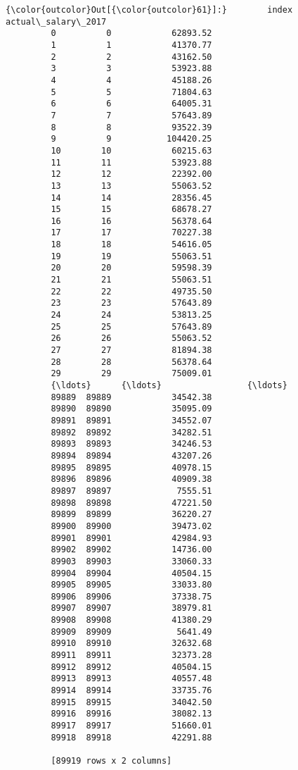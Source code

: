 \documentclass[11pt]{article}
\begin{document}
\begin{Verbatim}[commandchars=\\\{\}]
{\color{outcolor}Out[{\color{outcolor}61}]:}        index  actual\_salary\_2017
         0          0            62893.52
         1          1            41370.77
         2          2            43162.50
         3          3            53923.88
         4          4            45188.26
         5          5            71804.63
         6          6            64005.31
         7          7            57643.89
         8          8            93522.39
         9          9           104420.25
         10        10            60215.63
         11        11            53923.88
         12        12            22392.00
         13        13            55063.52
         14        14            28356.45
         15        15            68678.27
         16        16            56378.64
         17        17            70227.38
         18        18            54616.05
         19        19            55063.51
         20        20            59598.39
         21        21            55063.51
         22        22            49735.50
         23        23            57643.89
         24        24            53813.25
         25        25            57643.89
         26        26            55063.52
         27        27            81894.38
         28        28            56378.64
         29        29            75009.01
         {\ldots}      {\ldots}                 {\ldots}
         89889  89889            34542.38
         89890  89890            35095.09
         89891  89891            34552.07
         89892  89892            34282.51
         89893  89893            34246.53
         89894  89894            43207.26
         89895  89895            40978.15
         89896  89896            40909.38
         89897  89897             7555.51
         89898  89898            47221.50
         89899  89899            36220.27
         89900  89900            39473.02
         89901  89901            42984.93
         89902  89902            14736.00
         89903  89903            33060.33
         89904  89904            40504.15
         89905  89905            33033.80
         89906  89906            37338.75
         89907  89907            38979.81
         89908  89908            41380.29
         89909  89909             5641.49
         89910  89910            32632.68
         89911  89911            32373.28
         89912  89912            40504.15
         89913  89913            40557.48
         89914  89914            33735.76
         89915  89915            34042.50
         89916  89916            38082.13
         89917  89917            51660.01
         89918  89918            42291.88
         
         [89919 rows x 2 columns]
\end{Verbatim}
            
\end{document}
